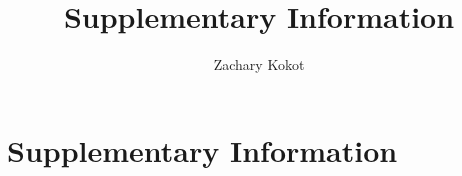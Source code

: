 \documentclass{article}
\author{Zachary Kokot}
\title{Supplementary Information}
\begin{document}
    \begin{titlepage}
        \maketitle
    \end{titlepage}

    \tableofcontents

    \section{Supplementary Information}
\end{document}

